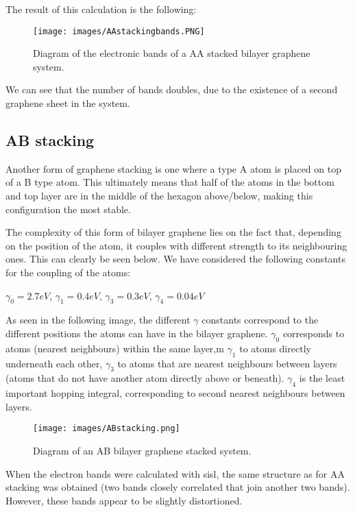 \documentclass[a4paper,12pt]{report}
\begin{document}
The result of this calculation is the following: 

\begin{figure}[h]
	\begin{center}
		\texttt{[image: images/AAstackingbands.PNG]}
	\end{center}
	\caption{Diagram of the electronic bands of a AA stacked bilayer graphene system. } 
	\label{fig:AAbilayergraphene}
\end{figure}

We can see that the number of bands doubles, due to the existence of a second graphene sheet in the system. 

\subsection{AB stacking}

Another form of graphene stacking is one where a type A atom is placed on top of a B type atom. This ultimately means that half of the atoms in the bottom and top layer are in the middle of the hexagon above/below, making this configuration the most stable. 

The complexity of this form of bilayer graphene lies on the fact that, depending on the position of the atom, it couples with different strength to its neighbouring ones. This can clearly be seen below. We have considered the following constants for the coupling of the atoms: 

$\gamma _0 = 2.7 eV$, $\gamma_1 = 0.4 eV$, $\gamma_3 = 0.3 eV$, $\gamma_4 = 0.04 eV$

As seen in the following image, the different $\gamma$ constants correspond to the different positions the atoms can have in the bilayer graphene. $\gamma _0$ corresponds to atoms (nearest neighbours) within the same layer,m $\gamma_1$ to atoms directly underneath each other, $\gamma_3$ to atoms that are nearest neighbours between  layers (atoms that do not have another atom directly above or beneath). $\gamma_4$ is the least important hopping integral, corresponding to second nearest neighbours between layers. 
\begin{figure}[h]
	\begin{center}
		\texttt{[image: images/ABstacking.png]}
	\end{center}
	\caption{Diagram of an AB bilayer graphene stacked system. } 
	\label{fig:ABbilayergraphene}
\end{figure}


When the electron bands were calculated with sisl, the same structure as for AA stacking was obtained (two bands closely correlated that join another two bands). However, these bands appear to be slightly distortioned. 
\end{document}
